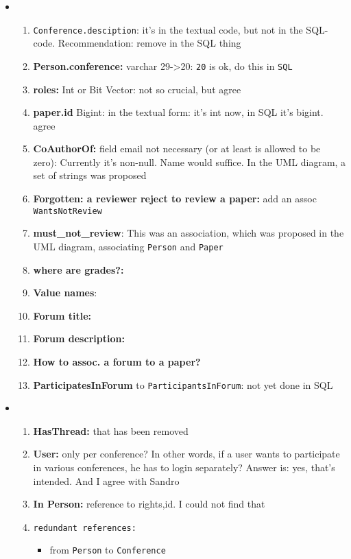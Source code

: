 \begin{itemize}
\item 
  \begin{enumerate}
  \item \texttt{Conference.desciption}: it's in the textual code, but not in
    the SQL-code. Recommendation: remove in the SQL thing
  \item \textbf{Person.conference:} varchar 29->20: \texttt{20} is ok, do this in
    \texttt{SQL}
  \item \textbf{roles:} Int or Bit Vector: not so crucial, but agree
  \item \textbf{paper.id} Bigint: in the textual form: it's int now, in SQL it's
    bigint. agree
  \item \textbf{CoAuthorOf:} field email not necessary (or at least is allowed
    to be zero): Currently it's non-null. Name would suffice. In the UML
    diagram, a set of strings was proposed
  \item \textbf{Forgotten: a reviewer reject to review a paper:} add an assoc
    \texttt{WantsNotReview}
  \item \textbf{must\_not\_review}: This was an association, which was proposed
    in the UML diagram, associating \texttt{Person} and \texttt{Paper}
  \item \textbf{where are grades?:} 
  \item \textbf{Value names}:
  \item \textbf{Forum title:}
  \item \textbf{Forum description:}
  \item \textbf{How to assoc. a forum to a paper?}
  \item \textbf{ParticipatesInForum} to \texttt{ParticipantsInForum}: not yet
    done in SQL
  \end{enumerate}
\item 
  \begin{enumerate}
  \item \textbf{HasThread:} that has been removed
  \item \textbf{User:} only per conference? In other words, if a user wants to
  participate in various conferences, he has to login separately? Answer is:
  yes, that's intended. And I agree with Sandro
\item \textbf{In Person:} reference to rights,id. I could not find that
\item \texttt{redundant references:}
  \begin{itemize}
  \item  from \texttt{Person} to  \texttt{Conference} 

\end{itemize}
\end{enumerate}
\end{itemize}
